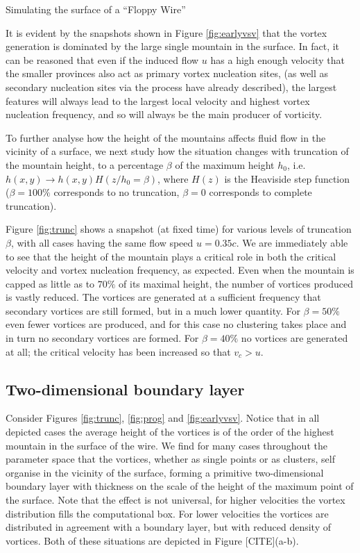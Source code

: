 \begin{chapter}{\label{cha:afm}Simulating the surface of a ``Floppy Wire''}
\begin{figure}[b]
\end{figure}
It is evident by the snapshots shown in Figure \ref{fig:earlyvsv} that the vortex generation is dominated by the large single mountain in the surface. In fact, it can be reasoned that even if the induced flow $u$ has a high enough velocity that the smaller provinces also act as primary vortex nucleation sites, (as well as secondary nucleation sites via the process have already described), the largest features will always lead to the largest local velocity and highest vortex nucleation frequency, and so will always be the main producer of vorticity.

To further analyse how the height of the mountains affects fluid flow in the vicinity of a surface, we next study how the situation changes with truncation of the mountain height, to a percentage $\beta$ of the maximum height $h_0$, i.e. $h(x,y) \rightarrow h(x,y) H(z/h_0=\beta)$, where $H(z)$ is the Heaviside step function ($\beta=100\%$ corresponds to no truncation, $\beta=0$ corresponds to complete truncation).

Figure \ref{fig:trunc} shows a snapshot (at fixed time) for various levels of truncation $\beta$, with all cases having the same flow speed $u=0.35c$.  We are immediately able to see that the height of the mountain plays a critical role in both the critical velocity and vortex nucleation frequency, as expected.  Even when the mountain is capped as little as to $70\%$ of its maximal height, the number of vortices produced is vastly reduced.  The vortices are generated at a sufficient frequency that secondary vortices are still formed, but in a much lower quantity.  For $\beta=50\%$ even fewer vortices are produced, and for this case no clustering takes place and in turn no secondary vortices are formed.  For $\beta=40\%$ no vortices are generated at all; the critical velocity has been increased so that $v_c>u$.
 
\subsection{Two-dimensional boundary layer}
Consider Figures \ref{fig:trunc}, \ref{fig:prog} and \ref{fig:earlyvsv}. Notice that in all depicted cases the average height of the vortices is of the order of the highest mountain in the surface of the wire. We find for many cases throughout the parameter space that the vortices, whether as single points or as clusters, self organise in the vicinity of the surface, forming a primitive two-dimensional boundary layer with thickness on the scale of the height of the maximum point of the surface. Note that the effect is not universal, for higher velocities the vortex distribution fills the computational box. For lower velocities the vortices are distributed in agreement with a boundary layer, but with reduced density of vortices. Both of these situations are depicted in Figure [CITE](a-b).


\end{chapter}
